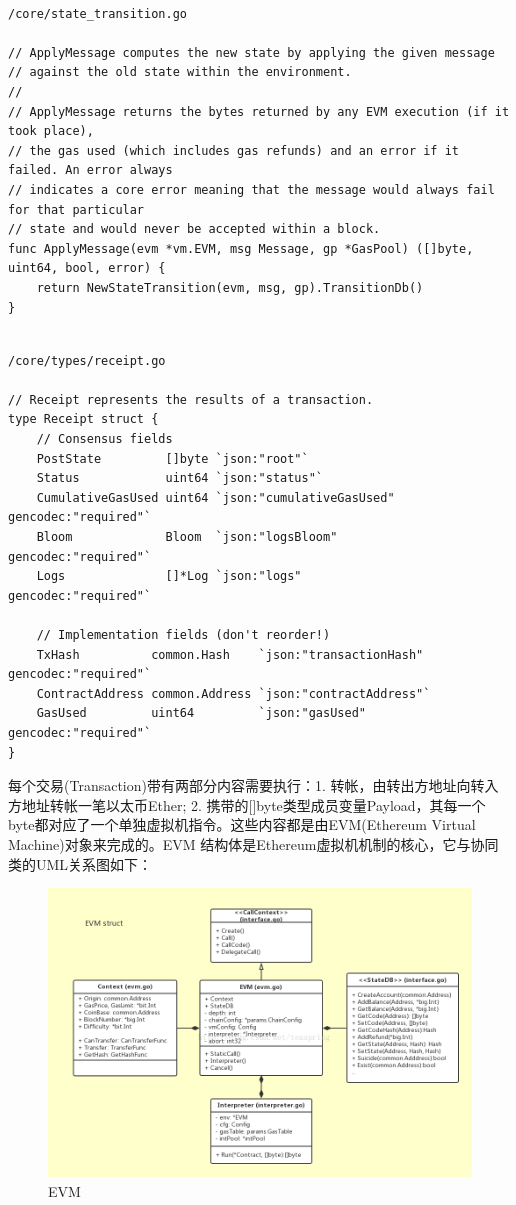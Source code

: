 \documentclass[UTF8]{ctexart}
\begin{document}
\begin{lstlisting}

/core/state_transition.go

// ApplyMessage computes the new state by applying the given message
// against the old state within the environment.
//
// ApplyMessage returns the bytes returned by any EVM execution (if it took place),
// the gas used (which includes gas refunds) and an error if it failed. An error always
// indicates a core error meaning that the message would always fail for that particular
// state and would never be accepted within a block.
func ApplyMessage(evm *vm.EVM, msg Message, gp *GasPool) ([]byte, uint64, bool, error) {
	return NewStateTransition(evm, msg, gp).TransitionDb()
}
\end{lstlisting}

\begin{lstlisting}

/core/types/receipt.go

// Receipt represents the results of a transaction.
type Receipt struct {
	// Consensus fields
	PostState         []byte `json:"root"`
	Status            uint64 `json:"status"`
	CumulativeGasUsed uint64 `json:"cumulativeGasUsed" gencodec:"required"`
	Bloom             Bloom  `json:"logsBloom"         gencodec:"required"`
	Logs              []*Log `json:"logs"              gencodec:"required"`

	// Implementation fields (don't reorder!)
	TxHash          common.Hash    `json:"transactionHash" gencodec:"required"`
	ContractAddress common.Address `json:"contractAddress"`
	GasUsed         uint64         `json:"gasUsed" gencodec:"required"`
}
\end{lstlisting}


每个交易(Transaction)带有两部分内容需要执行：1. 转帐，由转出方地址向转入方地址转帐一笔以太币Ether; 2. 携带的[]byte类型成员变量Payload，其每一个byte都对应了一个单独虚拟机指令。这些内容都是由EVM(Ethereum Virtual Machine)对象来完成的。EVM 结构体是Ethereum虚拟机机制的核心，它与协同类的UML关系图如下：

\begin{figure}[ht]
	\centering
	\includegraphics[scale=0.3]{evm.png}
	\caption{EVM}
	\label{evm}
\end{figure}
\end{document}
